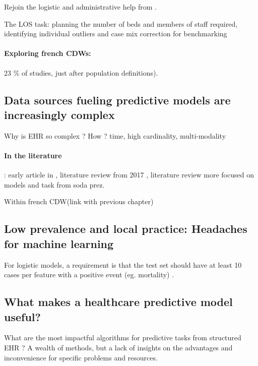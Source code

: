 \documentclass{report}
\begin{document}
Rejoin the logistic and administrative help from \cite{topol2019high}.

The LOS task: planning the number of beds and members of staff required,
identifying individual outliers and case mix correction for benchmarking \citep{verburg2017models}

\paragraph{Exploring french CDWs:} 23 \% of studies, just after population definitions).

\subsection{Data sources fueling predictive models are increasingly complex}\label{subsec:predictive_models:complex_data}

Why is EHR so complex ? How ? time, high cardinality, multi-modality

\paragraph{In the literature}: early article in \cite{wu2010prediction},
literature review from 2017 \citep{goldstein2017opportunities}, literature
review more focused on models and task from soda prez.

Within french CDW(link with previous chapter)

\subsection{Low prevalence and local practice: Headaches for machine learning}\label{subsec:predictive_models:low_prevalence}

For logistic models, a requirement is that the test set should have at least 10
cases per feature with a positive event (eg. mortality)
\citep{harrell1985regression,wyatt1995commentary}.

\subsection{What makes a healthcare predictive model useful?}\label{subsec:predictive_models:useful}

What are the most impactful algorithms for predictive tasks from structured EHR
? A wealth of methods, but a lack of insights on the advantages and
inconvenience for specific problems and resources.
\end{document}
